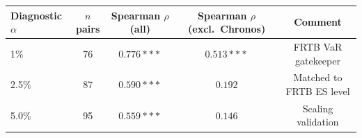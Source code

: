 \begin{tabular}{lcccc}
\toprule
Diagnostic $\alpha$ & $n$ pairs & Spearman $\rho$ (all) & Spearman $\rho$ (excl.\ Chronos) & Comment \\
\midrule
  1\% & 76 & $0.776***$ & $0.513***$ & FRTB VaR gatekeeper \\
  2.5\% & 87 & $0.590***$ & $0.192$ & Matched to FRTB ES level \\
  5.0\% & 95 & $0.559***$ & $0.146$ & Scaling validation \\
\bottomrule
\end{tabular}